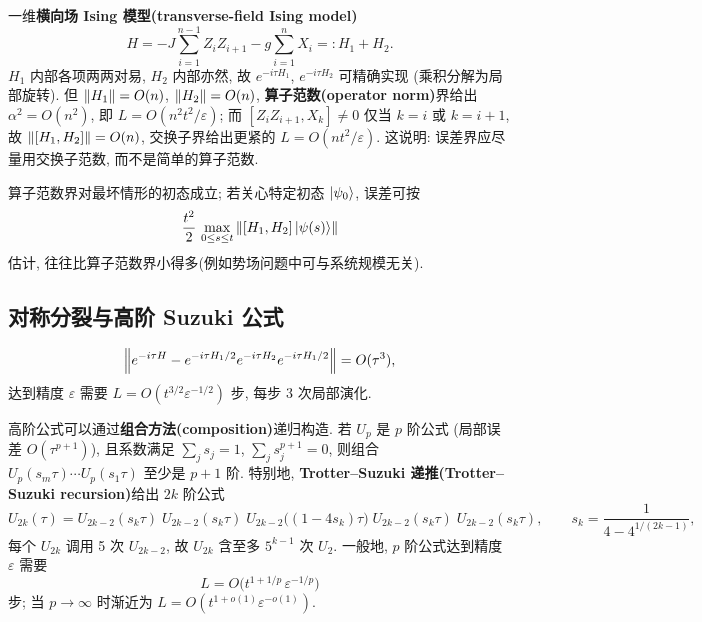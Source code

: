 \documentclass[utf8]{article} %
\numberwithin{equation}{section}   %
\newtheorem{Thm}{\hskip 2em {\color{blue} 定理}}[subsection]
\newtheorem{Note}{\hskip 2em {\color{red} 注}}[subsection]
\newtheorem{Eg}{\hskip 2em {\color{black} 例}}[subsection]
\begin{document}
\begin{Eg}
    一维\textbf{横向场 Ising 模型(transverse-field Ising model)}
    \[ H = -J\sum_{i=1}^{n-1} Z_i Z_{i+1} - g\sum_{i=1}^{n} X_i =: H_1 + H_2. \]
    $H_1$ 内部各项两两对易, $H_2$ 内部亦然, 故 $e^{-i\tau H_1}$, $e^{-i\tau H_2}$ 可精确实现
    (乘积分解为局部旋转). 但 $\norm{H_1} = O(n)$, $\norm{H_2} = O(n)$, \textbf{算子范数(operator norm)}界给出
    $\alpha^2 = O(n^2)$, 即 $L = O(n^2 t^2/\varepsilon)$; 而
    $[Z_i Z_{i+1}, X_k] \neq 0$ 仅当 $k = i$ 或 $k = i+1$, 故
    $\norm{[H_1, H_2]} = O(n)$, 交换子界给出更紧的 $L = O(n t^2/\varepsilon)$.
    这说明: 误差界应尽量用交换子范数, 而不是简单的算子范数.
\end{Eg}

\begin{Note}[向量范数界]
    算子范数界对最坏情形的初态成立; 若关心特定初态 $\ket{\psi_0}$, 误差可按
    \begin{equation}
        \frac{t^2}{2}\,\max_{0 \le s \le t}\norm{[H_1,H_2]\ket{\psi(s)}}
    \end{equation}
    估计, 往往比算子范数界小得多(例如势场问题中可与系统规模无关).
\end{Note}

\subsection{对称分裂与高阶 Suzuki 公式}

\begin{Thm}
    \begin{equation}
        \norm{e^{-i\tau H} - e^{-i\tau H_1/2} e^{-i\tau H_2} e^{-i\tau H_1/2}} = O(\tau^3),
    \end{equation}
    达到精度 $\varepsilon$ 需要 $L = O(t^{3/2} \varepsilon^{-1/2})$ 步, 每步 3 次局部演化.
\end{Thm}

\begin{Thm}[高阶 Suzuki 公式]
    高阶公式可以通过\textbf{组合方法(composition)}递归构造. 若 $U_p$ 是 $p$ 阶公式
    (局部误差 $O(\tau^{p+1})$), 且系数满足 $\sum_j s_j = 1$, $\sum_j s_j^{p+1} = 0$,
    则组合 $U_p(s_m\tau)\cdots U_p(s_1\tau)$ 至少是 $p+1$ 阶.
    特别地, \textbf{Trotter--Suzuki 递推(Trotter--Suzuki recursion)}给出 $2k$ 阶公式
    \begin{equation}
        U_{2k}(\tau) = U_{2k-2}(s_k\tau)\; U_{2k-2}(s_k\tau)\; U_{2k-2}\big((1-4s_k)\tau\big)\; U_{2k-2}(s_k\tau)\; U_{2k-2}(s_k\tau),
        \qquad s_k = \frac{1}{4 - 4^{1/(2k-1)}},
    \end{equation}
    每个 $U_{2k}$ 调用 5 次 $U_{2k-2}$, 故 $U_{2k}$ 含至多 $5^{k-1}$ 次 $U_2$.
    一般地, $p$ 阶公式达到精度 $\varepsilon$ 需要
    \begin{equation}
        L = O\!\big(t^{1+1/p}\,\varepsilon^{-1/p}\big)
    \end{equation}
    步; 当 $p \to \infty$ 时渐近为 $L = O(t^{1+o(1)}\varepsilon^{-o(1)})$.
\end{Thm}
\end{document}
